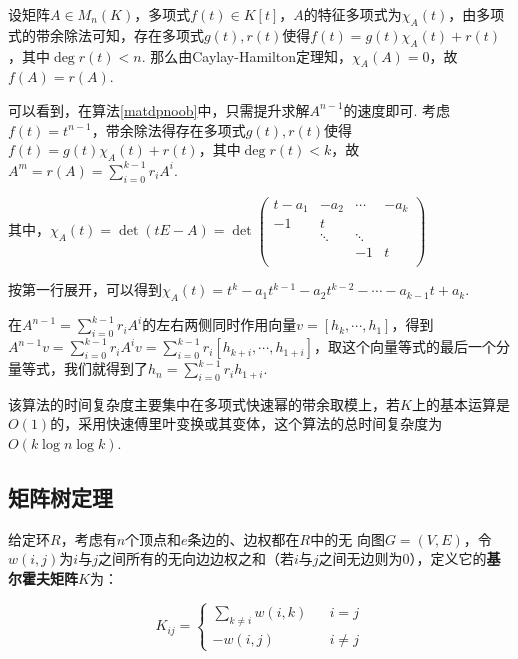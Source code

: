 \begin{algorithm}[计算矩阵的多项式]
	设矩阵$A\in M_n(K)$，多项式$f(t)\in K[t]$，$A$的特征多项式为$\chi_A(t)$，由多项式的带余除法可知，存在多项式$g(t),r(t)$使得$f(t)=g(t)\chi_A(t)+r(t)$，其中$\deg r(t)<n$. 那么由{\rm Caylay-Hamilton}定理知，$\chi_A(A)=0$，故$f(A)=r(A)$.
\end{algorithm}

\begin{algorithm}[常系数齐次线性递推]
	可以看到，在算法\ref{matdpnoob}中，只需提升求解$A^{n-1}$的速度即可. 考虑$f(t)=t^{n-1}$，带余除法得存在多项式$g(t),r(t)$使得$f(t)=g(t)\chi_A(t)+r(t)$，其中$\deg r(t)<k$，故$A^m=r(A)=\sum\limits_{i=0}^{k-1} r_i A^i$.
		
	其中，$\chi_A(t)=\det(tE-A)=\det
	\begin{pmatrix}
		t-a_1 & -a_2 & \cdots & -a_k\\
		-1 & t & & \\
		& \ddots & \ddots & \\
		& & -1 & t\\
	\end{pmatrix}$

	按第一行展开，可以得到$\chi_A(t)=t^k-a_1 t^{k-1}-a_2 t^{k-2}-\cdots-a_{k-1}t+a_k$.
	
	在$A^{n-1}=\sum\limits_{i=0}^{k-1} r_i A^i$的左右两侧同时作用向量$v=[h_k,\cdots,h_1]$，得到$A^{n-1} v=\sum\limits_{i=0}^{k-1} r_i A^i v=\sum\limits_{i=0}^{k-1} r_i [h_{k+i},\cdots,h_{1+i}]$，取这个向量等式的最后一个分量等式，我们就得到了$h_n=\sum\limits_{i=0}^{k-1} r_i h_{1+i}$.
	
	该算法的时间复杂度主要集中在多项式快速幂的带余取模上，若$K$上的基本运算是$O(1)$的，采用快速傅里叶变换或其变体，这个算法的总时间复杂度为$O(k\log n\log k)$.
\end{algorithm}

\subsection{矩阵树定理}

给定环$R$，考虑有$n$个顶点和$e$条边的、边权都在$R$中的无
向图$G=(V,E)$，令$w(i,j)$为$i$与$j$之间所有的无向边边权之和（若$i$与$j$之间无边则为0），定义它的\textbf{基尔霍夫矩阵}$K$为：

$$
K_{ij}=\left\{
\begin{array}{rcl}
	\sum\limits_{k\neq i}w(i,k) & & i=j\\
	-w(i,j) & & {i\neq j}
\end{array} \right.
$$

